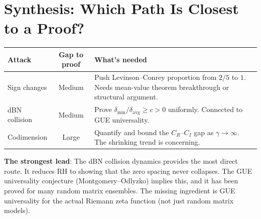 \documentclass[11pt]{article}
\begin{document}
\section{Synthesis: Which Path Is Closest to a Proof?}

\begin{center}
\begin{tabular}{lcp{7cm}}
\toprule
\textbf{Attack} & \textbf{Gap to proof} & \textbf{What's needed} \\
\midrule
Sign changes & Medium & Push Levinson--Conrey proportion from $2/5$ to $1$. Needs mean-value theorem breakthrough or structural argument. \\
dBN collision & Medium & Prove $\delta_{\min}/\delta_{\mathrm{avg}} \geq c > 0$ uniformly. Connected to GUE universality. \\
Codimension & Large & Quantify and bound the $C_R$--$C_I$ gap as $\gamma \to \infty$. The shrinking trend is concerning. \\
\bottomrule
\end{tabular}
\end{center}

\noindent\textbf{The strongest lead}: The dBN collision dynamics provides the most direct route.  It reduces RH to showing that the zero spacing never collapses.  The GUE universality conjecture (Montgomery--Odlyzko) implies this, and it has been proved for many random matrix ensembles.  The missing ingredient is GUE universality for the actual Riemann zeta function (not just random matrix models).
\end{document}
